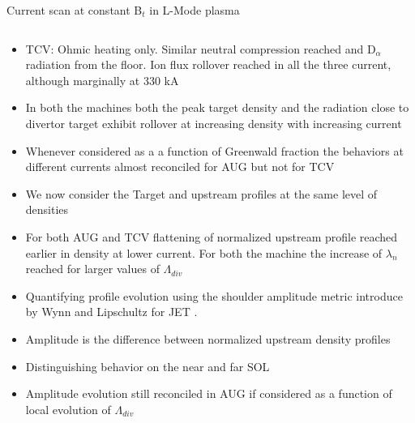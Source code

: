 \documentclass[10pt, compress]{beamer}
\begin{document}
\begin{frame}{Current scan at constant B$_t$ in L-Mode plasma}
\begin{columns}
\begin{column}{0.4\textwidth}
\begin{itemize}
          avoid earlier disruption. Similar neutral pressure in the
          subdivertor region reached. NBI additional power added to
          keep power in the SOL approximately constant
        \item<3|only@3> TCV: Ohmic heating only. Similar neutral compression reached and
          D$_{\alpha}$ radiation from the floor. Ion flux rollover
          reached in all the three current,  although marginally at
          330 kA
        \item<4|only@4> In both the machines both the peak target
          density and the radiation close to divertor target exhibit
          rollover at increasing density with increasing current
        \item<5|only@5> Whenever considered as a a function of
          Greenwald fraction the behaviors at different currents
          almost reconciled for AUG \alert{but not for TCV}
        \item<only@6-7> We now consider the Target and upstream
          profiles at the same level of densities  
        \item<only@7> For both AUG and TCV flattening of normalized
          upstream profile reached \alert{earlier in density at lower
            current.} For both the machine the increase of $\lambda_n$
          reached for larger values of $\Lambda_{div}$
        \item<only@8> Quantifying profile evolution using the
          \alert{shoulder amplitude metric} introduce by Wynn and
          Lipschultz for JET \parencite{Wynn:2018gp}.
        \item<only@8>  \alert{Amplitude is the difference
            between normalized upstream density profiles}
        \item<only@8> Distinguishing behavior on the near and far SOL  
        \item<only@11> Amplitude evolution still reconciled in AUG if
          considered as a function of local evolution of $\Lambda_{div}$
      \end{itemize}
    \end{column}
  \end{columns}
\end{frame}  
\end{document}
